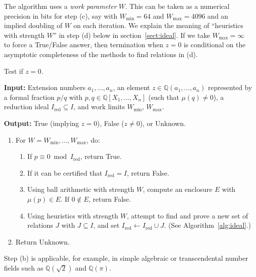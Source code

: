 \documentclass[sigconf,screen,urlbreakonhyphens]{acmart}
\begin{document}
The algorithm uses a \emph{work parameter} $W$. This can
be taken as a numerical precision in bits for step (c), say with
$W_{\text{min}} = 64$ and $W_{\text{max}} = 4096$
and an implied doubling of $W$ on each iteration.
We explain the meaning of ``heuristics with strength $W$'' in step (d) below in section~\ref{sect:ideal}.
If we take $W_{\text{max}} = \infty$ to force a True/False answer,
then termination when $z = 0$ is conditional
on the asymptotic completeness of the methods to find relations in (d).

\begin{algorithm}
\caption{Test if $z = 0$.}

\SetAlgoLined

\textbf{Input:} Extension numbers $a_1,\ldots,a_n$, an element $z \in \mathbb{Q}(a_1,\ldots,a_n)$
represented by a formal fraction $p / q$ with $p, q \in \mathbb{Q}[X_1,\ldots,X_n]$ (such that $\mu(q) \ne 0$),
a reduction ideal $I_{\text{red}} \subseteq I$, and work limits $W_{\text{min}}$, $W_{\text{max}}$.

\textbf{Output:} True (implying $z = 0$), False ($z \ne 0$), or Unknown.

\vspace*{-0.15cm}
\hrulefill
\vspace*{-0.1cm}

\begin{enumerate}

\item For $W = W_{\text{min}}, \ldots, W_{\text{max}}$, do:
\begin{enumerate}
\item If $p \equiv 0 \bmod I_{\text{red}}$, return True.
\item If it can be certified that $I_{\text{red}} = I$, return False.
\item Using ball arithmetic with strength $W$, compute an enclosure $E$ with $\mu(p) \in E$. If $0 \not\in E$, return False.
\item Using heuristics with strength $W$, attempt to find and prove a new set of relations $J$ with $J \subseteq I$, and set $I_{\text{red}} \gets I_{\text{red}} \cup J$. (See Algorithm~\ref{alg:ideal}.)
\end{enumerate}
\item Return Unknown.
\end{enumerate}

\label{alg:decision}
\end{algorithm}

Step (b) is applicable, for example, in simple algebraic or transcendental number
fields such as $\mathbb{Q}(\sqrt{2})$ and $\mathbb{Q}(\pi)$.
\end{document}
